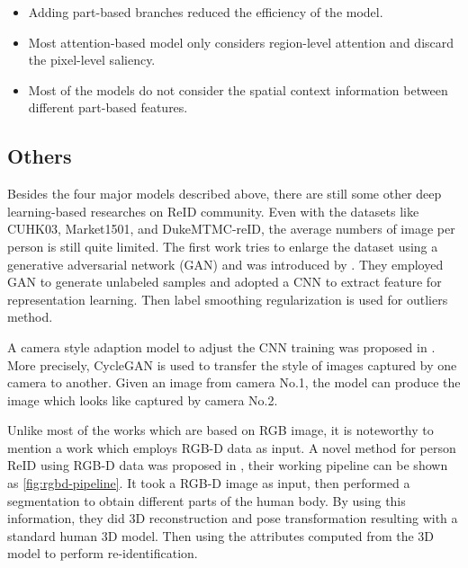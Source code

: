 \begin{itemize}
    \item Adding part-based branches reduced the efficiency of the model.
    \item Most attention-based model only considers region-level attention and 
    discard the pixel-level saliency.
    \item Most of the models do not consider the spatial context information 
    between different part-based features.
\end{itemize}

\subsection{Others}
\label{sec:related_work_other}

Besides the four major models described above, there are still some other deep 
learning-based researches on ReID community.
Even with the datasets like CUHK03, Market1501, and DukeMTMC-reID, the average 
numbers of image per person is still quite limited. The first work tries to 
enlarge the dataset using a generative adversarial network (GAN) and was 
introduced by \cite{first-gan-for-reid}. They employed GAN to generate 
unlabeled samples and adopted a CNN to extract feature for representation 
learning. Then label smoothing regularization is used for outliers method.

A camera style adaption model to adjust the CNN training was proposed in 
\cite{camera-style-adaptation-for-reid}. 
More precisely, CycleGAN is used to transfer the style of images captured by 
one camera to another. Given an image from camera No.1, the model
can produce the image which looks like captured by camera No.2.

Unlike most of the works which are based on RGB image, it is noteworthy to 
mention a work which employs RGB-D data as input.
A novel method for person ReID using RGB-D data was proposed in 
\cite{rgbd-for-reid}, their working pipeline can be shown as 
\autoref{fig:rgbd-pipeline}.
It took a RGB-D image as input, then performed a segmentation to obtain 
different parts of the human body. By using this information, they
did 3D reconstruction and pose transformation resulting with a standard human 
3D model. Then using the attributes computed from
the 3D model to perform re-identification.

